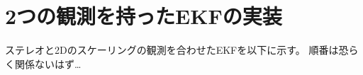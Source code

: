 \documentclass[10pt,dvipdfmx,fleqn]{jarticle}
\begin{document}
    \begin{center}
    \end{center}
    { \hspace*{\fill} \\}
    
    \begin{center}
    \end{center}
    { \hspace*{\fill} \\}
    
    \begin{center}
    \end{center}
    { \hspace*{\fill} \\}
    
    \begin{center}
    \end{center}
    { \hspace*{\fill} \\}
    
    \begin{center}
    \end{center}
    { \hspace*{\fill} \\}
    
    \section{2つの観測を持ったEKFの実装}\label{ux3064ux306eux89b3ux6e2cux3092ux6301ux3063ux305fekfux306eux5b9fux88c5}

ステレオと2Dのスケーリングの観測を合わせたEKFを以下に示す。
順番は恐らく関係ないはず\ldots{}
\end{document}
